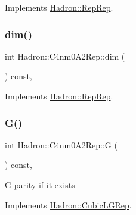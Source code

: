 Implements \mbox{\hyperlink{structHadron_1_1RepRep_a92c8802e5ed7afd7da43ccfd5b7cd92b}{Hadron\+::\+Rep\+Rep}}.

\mbox{\label{structHadron_1_1C4nm0A2Rep_ad3e51768eee5d4652aa8ceae670d6fb9}} 
\subsubsection{\texorpdfstring{dim()}{dim()}\hspace{0.1cm}{\footnotesize\ttfamily [3/3]}}
{\footnotesize\ttfamily int Hadron\+::\+C4nm0\+A2\+Rep\+::dim (\begin{DoxyParamCaption}{ }\end{DoxyParamCaption}) const\hspace{0.3cm}{\ttfamily [inline]}, {\ttfamily [virtual]}}



Implements \mbox{\hyperlink{structHadron_1_1RepRep_a92c8802e5ed7afd7da43ccfd5b7cd92b}{Hadron\+::\+Rep\+Rep}}.

\mbox{\label{structHadron_1_1C4nm0A2Rep_adefa492c65021016023f200b4c397770}} 
\subsubsection{\texorpdfstring{G()}{G()}\hspace{0.1cm}{\footnotesize\ttfamily [1/2]}}
{\footnotesize\ttfamily int Hadron\+::\+C4nm0\+A2\+Rep\+::G (\begin{DoxyParamCaption}{ }\end{DoxyParamCaption}) const\hspace{0.3cm}{\ttfamily [inline]}, {\ttfamily [virtual]}}

G-\/parity if it exists 

Implements \mbox{\hyperlink{structHadron_1_1CubicLGRep_ace26f7b2d55e3a668a14cb9026da5231}{Hadron\+::\+Cubic\+L\+G\+Rep}}.

\mbox{\label{structHadron_1_1C4nm0A2Rep_adefa492c65021016023f200b4c397770}} 
